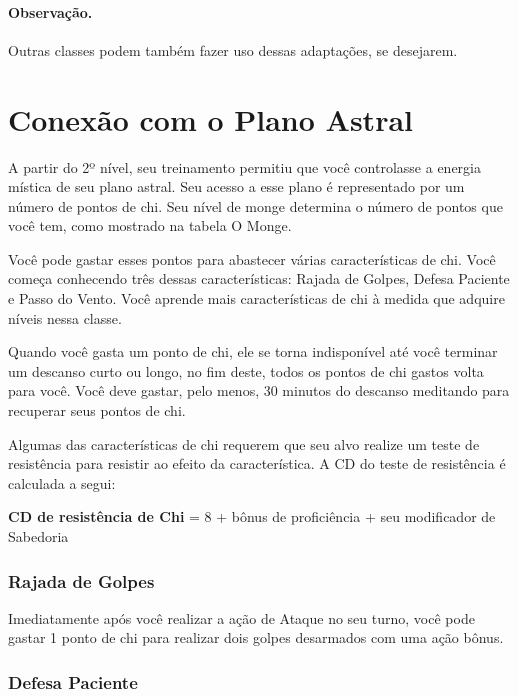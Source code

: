 \begin{multicols}{2}
\paragraph{Observação.}%

Outras classes podem também fazer uso dessas adaptações, se desejarem.

\section*{Conexão com o Plano Astral}%
\label{sec:conexao_com_o_plano_astral}

A partir do 2º nível, seu treinamento permitiu que você controlasse a energia
mística de seu plano astral. Seu acesso a esse plano é representado por um
número de pontos de chi. Seu nível de monge determina o número de pontos que
você tem, como mostrado na tabela O Monge.

Você pode gastar esses pontos para abastecer várias características de chi. Você
começa conhecendo três dessas características: Rajada de Golpes, Defesa Paciente
e Passo do Vento. Você aprende mais características de chi à medida que adquire
níveis nessa classe.

Quando você gasta um ponto de chi, ele se torna indisponível até você terminar
um descanso curto ou longo, no fim deste, todos os pontos de chi gastos volta
para você. Você deve gastar, pelo menos, 30 minutos do descanso meditando para
recuperar seus pontos de chi.

Algumas das características de chi requerem que seu alvo realize um teste de
resistência para resistir ao efeito da característica. A CD do teste de
resistência é calculada a segui:

\begin{center}
\textbf{CD de resistência de Chi} = 8 + bônus de proficiência +
seu modificador de Sabedoria
\end{center}

\subsubsection*{Rajada de Golpes}%
\label{ssub:rajada_de_golpes}

Imediatamente após você realizar a ação de Ataque no seu turno, você pode gastar
1 ponto de chi para realizar dois golpes desarmados com uma ação bônus.

\subsubsection{Defesa Paciente}%
\label{ssub:defesa_paciente}


\end{multicols}
